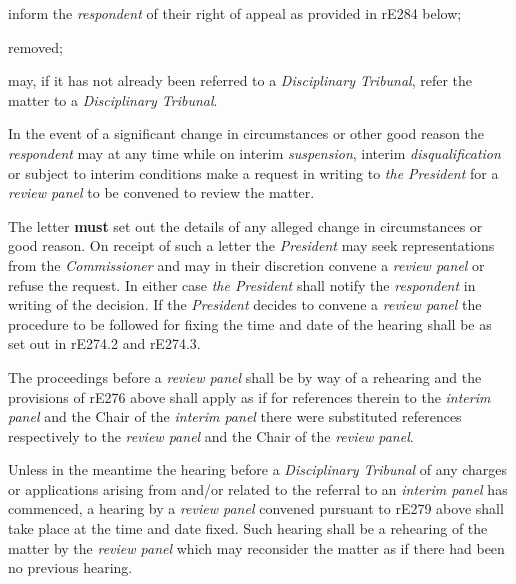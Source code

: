 \item  inform the \emph{respondent} of their right of appeal as provided in
rE284 below;\\
\item  removed;\item may, if it has not already been referred to a \emph{Disciplinary
Tribunal}, refer the matter to a \emph{Disciplinary Tribunal}.\la\ln
{}\par
{}
In the event of a significant change in circumstances or other good
reason the \emph{respondent} may at any time while on
interim \emph{suspension}, interim \emph{disqualification} or subject to
interim conditions make a request in writing to \emph{the President} for
a \emph{review panel} to be convened to review the matter.\\
\par
The letter  \textcolor{myred}{\textbf{must}} set out the details of any alleged change in
circumstances or good reason.  On receipt of such a letter
the \emph{President} may seek representations from
the \emph{Commissioner }and may in their discretion convene
a \emph{review panel} or refuse the request. In either case \emph{the
President} shall notify the \emph{respondent} in writing of the
decision. If the \emph{President} decides to convene a \emph{review
panel} the procedure to be followed for fixing the time and date of the
hearing shall be as set out in rE274.2 and rE274.3.\\
\par
The proceedings before a \emph{review panel} shall be by way of a
rehearing and the provisions of \textbf{ } rE276 above shall apply as if
for references therein to the \emph{interim panel} and the Chair of
the \emph{interim panel} there were substituted references respectively
to the \emph{review panel} and the Chair of the \emph{review panel}.\\
\par
Unless in the meantime the hearing before a \emph{Disciplinary
Tribunal} of any charges or applications arising from and/or related to
the referral to an \emph{interim panel} has commenced, a hearing by
a \emph{review panel} convened pursuant to rE279 above shall take place
at the time and date fixed. Such hearing shall be a rehearing of the
matter by the \emph{review panel} which may reconsider the matter as if
there had been no previous hearing.\\
